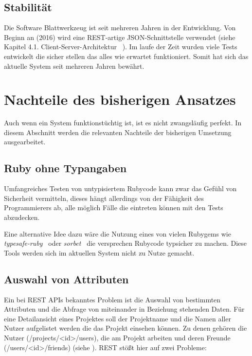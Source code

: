 \subsection{Stabilität}
\label{sec:requirements:pros:stable}
Die Software Blattwerkzeug ist seit mehreren Jahren in der Entwicklung. Von Beginn an (2016) wird
eine REST-artige JSON-Schnittstelle verwendet (siehe Kapitel 4.1. Client-Server-Architektur ~\cite{riemer2016}).
Im laufe der Zeit wurden viele Tests entwickelt die sicher stellen das alles wie erwartet funktioniert.
Somit hat sich das aktuelle System seit mehreren Jahren bewährt.

\section{Nachteile des bisherigen Ansatzes}
\label{sec:requirements:cons:typescript}
Auch wenn ein System funktionstüchtig ist, ist es nicht zwangsläufig perfekt.
In diesem Abschnitt werden die relevanten Nachteile der bisherigen Umsetzung ausgearbeitet.

\subsection{Ruby ohne Typangaben}
Umfangreiches Testen von untypisiertem Rubycode kann zwar das Gefühl von Sicherheit vermitteln, dieses hängt allerdings von der Fähigkeit des Programmierers ab, alle möglich Fälle die eintreten können mit den Tests abzudecken.

Eine alternative Idee dazu wäre die Nutzung eines von vielen Rubygems wie \emph{typesafe-ruby}~\cite{typesafe-ruby}
oder \emph{sorbet}~\cite{sorbet} die versprechen Rubycode typsicher zu machen. Diese Tools werden sich im aktuellen System nicht zu Nutze gemacht.

\subsection{Auswahl von Attributen}
\label{sec:requirements:cons:attributes}
Ein bei REST APIs bekanntes Problem ist die Auswahl von bestimmten Attributen und die Abfrage von miteinander in Beziehung stehenden Daten.
Für eine Detailansicht eines Projektes soll der Projektname und die Namen aller Nutzer aufgelistet werden die das Projekt einsehen können.
Zu denen gehören die Nutzer (/projects/<id>/users), die am Projekt arbeiten und deren Freunde (/users/<id>/friends) (siehe ).
REST stößt hier auf zwei Probleme:

